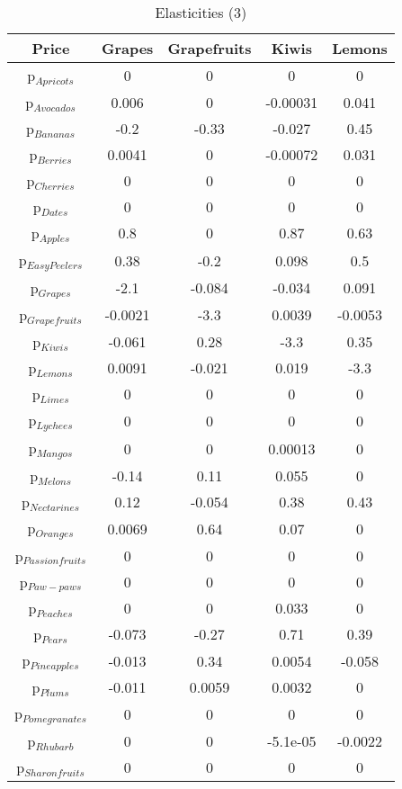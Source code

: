 \documentclass[11pt]{article}
\begin{document}
\begin{table}[h]
\caption{Elasticities (3)}
\label{Table: elasticities 3}
\begin{center}
\begin{tabular}{ccccc}
Price & Grapes & Grapefruits & Kiwis & Lemons \\ \hline
p$_{Apricots}$ & 0 & 0 & 0 & 0 \\ 
p$_{Avocados}$ & 0.006 & 0 & -0.00031 & 0.041 \\ 
p$_{Bananas}$ & -0.2 & -0.33 & -0.027 & 0.45 \\ 
p$_{Berries}$ & 0.0041 & 0 & -0.00072 & 0.031 \\ 
p$_{Cherries}$ & 0 & 0 & 0 & 0 \\ 
p$_{Dates}$ & 0 & 0 & 0 & 0 \\ 
p$_{Apples}$ & 0.8 & 0 & 0.87 & 0.63 \\ 
p$_{Easy Peelers}$ & 0.38 & -0.2 & 0.098 & 0.5 \\ 
p$_{Grapes}$ & -2.1 & -0.084 & -0.034 & 0.091 \\ 
p$_{Grapefruits}$ & -0.0021 & -3.3 & 0.0039 & -0.0053 \\ 
p$_{Kiwis}$ & -0.061 & 0.28 & -3.3 & 0.35 \\ 
p$_{Lemons}$ & 0.0091 & -0.021 & 0.019 & -3.3 \\ 
p$_{Limes}$ & 0 & 0 & 0 & 0 \\ 
p$_{Lychees}$ & 0 & 0 & 0 & 0 \\ 
p$_{Mangos}$ & 0 & 0 & 0.00013 & 0 \\ 
p$_{Melons}$ & -0.14 & 0.11 & 0.055 & 0 \\ 
p$_{Nectarines}$ & 0.12 & -0.054 & 0.38 & 0.43 \\ 
p$_{Oranges}$ & 0.0069 & 0.64 & 0.07 & 0 \\ 
p$_{Passion fruits}$ & 0 & 0 & 0 & 0 \\ 
p$_{Paw-paws}$ & 0 & 0 & 0 & 0 \\ 
p$_{Peaches}$ & 0 & 0 & 0.033 & 0 \\ 
p$_{Pears}$ & -0.073 & -0.27 & 0.71 & 0.39 \\ 
p$_{Pineapples}$ & -0.013 & 0.34 & 0.0054 & -0.058 \\ 
p$_{Plums}$ & -0.011 & 0.0059 & 0.0032 & 0 \\ 
p$_{Pomegranates}$ & 0 & 0 & 0 & 0 \\ 
p$_{Rhubarb}$ & 0 & 0 & -5.1e-05 & -0.0022 \\ 
p$_{Sharon fruits}$ & 0 & 0 & 0 & 0 \\ 
\end{tabular}
\end{center}
\end{table}
\end{document}
